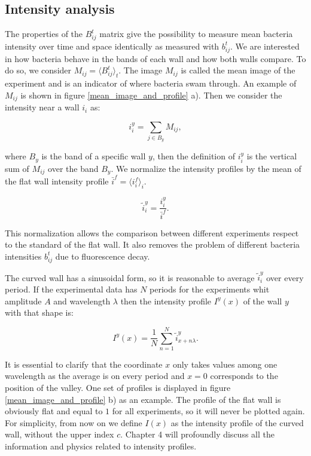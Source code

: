 \subsection{Intensity analysis}

The properties of the $B_{ij}^t$ matrix give the possibility to measure mean bacteria intensity over time and space identically as measured with $ b_{ij}^t$. We are interested in how bacteria behave in the bands of each wall and how both walls compare. To do so, we consider $M_{ij} = \langle B_{ij}^t \rangle_t $. The image $M_{ij}$ is called the mean image of the experiment and is an indicator of where bacteria swam through. An example of $M_{ij}$ is shown in figure \ref{mean_image_and_profile} a). Then we consider the intensity near a wall $i_i$ as:

\begin{equation}
	i_i^y = \sum_{j \in B_y} M_{ij},
\end{equation}

where $B_y$ is the band of a specific wall $y$, then the definition of $i_i^y$ is the vertical sum of $M_{ij}$ over the band $B_y$. We normalize the intensity profiles by the mean of the flat wall intensity profile $\bar{i}^f = \langle  i_i^f\rangle_i $. 

\begin{equation}  
	\tilde{i}_i^y = \frac{i_i^y}{\bar{i}^f}.
\end{equation}

This normalization allows the comparison between different experiments respect to the standard of the flat wall. It also removes the problem of different bacteria intensities $b_{ij}^t$ due to fluorescence decay. 

The curved wall has a sinusoidal form, so it is reasonable to average $\tilde{i}_i^y$ over every period. If the experimental data has $N$ periods for the experiments whit amplitude $A$ and wavelength $\lambda$ then the intensity profile $I^y(x)$ of the wall $y$ with that shape is:

\begin{equation} \label{eq:Intensity profile}
	I^y(x) = \frac{1}{N} \sum_{n=1}^N \tilde{i}_{x+ n\lambda}^y.
\end{equation}

It is essential to clarify that the coordinate $x$ only takes values among one wavelength as the average is on every period and $x=0$ corresponds to the position of the valley. One set of profiles is displayed in figure \ref{mean_image_and_profile} b) as an example. The profile of the flat wall is obviously flat and equal to $1$ for all experiments, so it will never be plotted again. For simplicity, from now on we define $I(x)$ as the intensity profile of the curved wall, without the upper index $c$. Chapter 4 will profoundly discuss all the information and physics related to intensity profiles.


